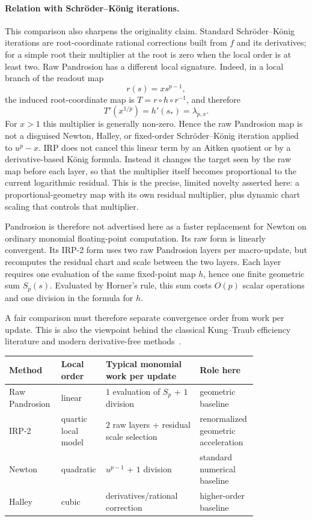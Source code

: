 \documentclass[10pt,a4paper]{article}
\theoremstyle{plain}
\theoremstyle{definition}
\theoremstyle{remark}
\begin{document}
\paragraph{Relation with Schröder--König iterations.}
This comparison also sharpens the originality claim.  Standard Schröder--König
iterations are root-coordinate rational corrections built from $f$ and its
derivatives; for a simple root their multiplier at the root is zero when the
local order is at least two.  Raw Pandrosion has a different local signature.
Indeed, in a local branch of the readout map
\[
  r(s)=x s^{p-1},
\]
the induced root-coordinate map is $T=r\circ h\circ r^{-1}$, and therefore
\[
  T'(x^{1/p})=h'(s_*)=\lambda_{p,x}.
\]
For $x>1$ this multiplier is generally non-zero.  Hence the raw Pandrosion map
is not a disguised Newton, Halley, or fixed-order Schröder--König iteration
applied to $u^p-x$.  IRP does not cancel this linear term by an Aitken quotient or by a derivative-based
König formula.  Instead it changes the target seen by the raw map before each
layer, so that the multiplier itself becomes proportional to the current
logarithmic residual.  This is the precise, limited novelty asserted here: a
proportional-geometry map with its own residual multiplier, plus dynamic chart
scaling that controls that multiplier.

Pandrosion is therefore not advertised here as a faster replacement for Newton
on ordinary monomial floating-point computation.  Its raw form is linearly convergent.  Its IRP-2 form uses two raw Pandrosion
layers per macro-update, but recomputes the residual chart and scale between
the two layers.  Each layer requires one evaluation of the same fixed-point map
$h$, hence one finite geometric sum $S_p(s)$.  Evaluated by
Horner's rule, this sum costs $O(p)$ scalar operations and one division in the
formula for $h$.

A fair comparison must therefore separate convergence order from work per
update.  This is also the viewpoint behind the classical Kung--Traub efficiency
literature and modern derivative-free methods~\cite{kungtraub,petkovic2013,cordero2013,sharma2014}.

\begin{center}
\scriptsize
\begin{tabular}{@{}>{\raggedright\arraybackslash}p{0.20\linewidth}>{\raggedright\arraybackslash}p{0.10\linewidth}>{\raggedright\arraybackslash}p{0.36\linewidth}>{\raggedright\arraybackslash}p{0.16\linewidth}@{}}
\toprule
Method & Local order & Typical monomial work per update & Role here \\
\midrule
Raw Pandrosion & linear & $1$ evaluation of $S_p$ + $1$ division & geometric baseline \\
IRP-2 & quartic local model & $2$ raw layers + residual scale selection & renormalized geometric acceleration \\
Newton & quadratic & $u^{p-1}$ + $1$ division & standard numerical baseline \\
Halley & cubic & derivatives/rational correction & higher-order baseline \\
\bottomrule
\end{tabular}
\end{center}
\end{document}
